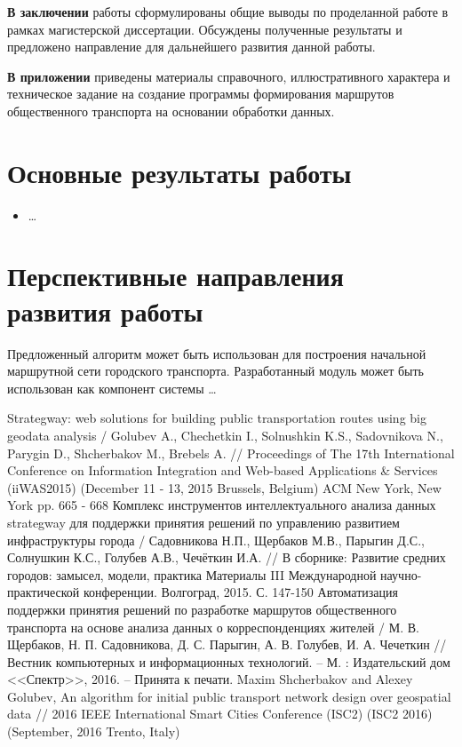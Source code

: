 \textbf{В заключении} работы сформулированы общие выводы по проделанной работе в рамках магистерской диссертации. 
Обсуждены полученные результаты и предложено направление для дальнейшего развития данной работы.

\textbf{В приложении} приведены материалы справочного, иллюстративного характера и техническое задание на 
создание программы формирования маршрутов общественного транспорта на основании обработки данных.

\section{Основные результаты работы}
\begin{itemize}
    \item \ldots
\end{itemize}

\section{Перспективные направления развития работы}
Предложенный алгоритм может быть использован для построения начальной маршрутной сети городского транспорта.
Разработанный модуль может быть использован как компонент системы \ldots

\renewcommand{\bibname}{Публикации по теме диссертации}
\begin{thebibliography}{10}
     Strategway: web solutions for building public transportation routes using big geodata 
        analysis / Golubev A., Chechetkin I., Solnushkin K.S., Sadovnikova N., Parygin D., Shcherbakov M., 
        Brebels A. // Proceedings of The 17th International Conference on Information Integration and 
        Web-based Applications \& Services (iiWAS2015) (December 11 - 13, 2015 Brussels, Belgium) 
        ACM New York, New York pp. 665 - 668
     Комплекс инструментов интеллектуального анализа данных strategway для поддержки 
        принятия решений по управлению развитием инфраструктуры города / Садовникова Н.П., Щербаков М.В., 
        Парыгин Д.С., Солнушкин К.С., Голубев А.В., Чечёткин И.А. // В сборнике: Развитие средних 
        городов: замысел, модели, практика Материалы III Международной научно-практической конференции. 
        Волгоград, 2015. С. 147-150
     Автоматизация поддержки принятия решений по разработке маршрутов общественного 
        транспорта на основе анализа данных о корреспонденциях жителей / М. В. Щербаков, 
        Н. П. Садовникова, Д. С. Парыгин, А. В. Голубев, И. А. Чечеткин // Вестник компьютерных и 
        информационных технологий. -- М. : Издательский дом <<Спектр>>, 2016. -- Принята к печати.
     Maxim Shcherbakov and Alexey Golubev, An algorithm for initial public transport network 
        design over geospatial data // 2016 IEEE International Smart Cities Conference (ISC2) (ISC2 2016) 
        (September, 2016 Trento, Italy)
\end{thebibliography}